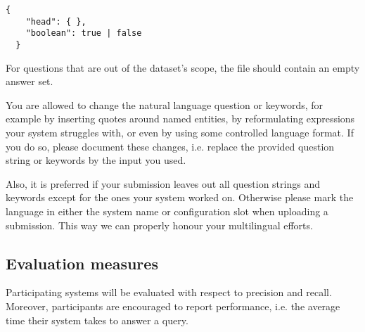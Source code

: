 \begin{lstlisting}[escapechar=!]
  {
    "head": { },
    "boolean": true | false
  }
\end{lstlisting}

For questions that are out of the dataset's scope, the file should contain an empty answer set.

You are allowed to change the natural language question or keywords, for example by inserting quotes around named entities,
by reformulating expressions your system struggles with, or even by using some controlled language format.
If you do so, please document these changes, i.e. replace the provided question string or keywords by the input you used.

Also, it is preferred if your submission leaves out all question strings and keywords except for the ones your system worked on.
Otherwise please mark the language in either the system name or configuration slot when uploading a submission.
This way we can properly honour your multilingual efforts.


\subsection{Evaluation measures}
\label{evalmeasures}

Participating systems will be evaluated with respect to precision and recall.
Moreover, participants are encouraged to report performance, i.e. the average time their system takes to answer a query.

